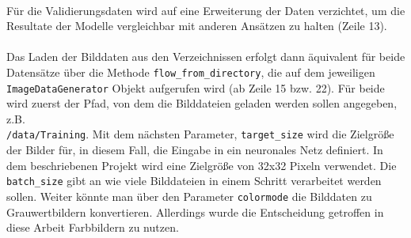 \\
Für die Validierungsdaten wird auf eine Erweiterung der Daten verzichtet, um die Resultate der Modelle vergleichbar mit anderen Ansätzen zu halten (Zeile 13).\\
\\
Das Laden der Bilddaten aus den Verzeichnissen erfolgt dann äquivalent für beide Datensätze über die Methode \texttt{flow\_from\_directory}, die auf dem jeweiligen\\
\texttt{ImageDataGenerator} Objekt aufgerufen wird (ab Zeile 15 bzw. 22). Für beide wird zuerst der Pfad, von dem die Bilddateien geladen werden sollen angegeben, z.B. \\
\texttt{/data/Training}. Mit dem nächsten Parameter, \texttt{target\_size} wird die Zielgröße der Bilder für, in diesem Fall, die Eingabe in ein neuronales Netz definiert. In dem beschriebenen Projekt wird eine Zielgröße von 32x32 Pixeln verwendet. Die \texttt{batch\_size} gibt an wie viele Bilddateien in einem Schritt verarbeitet werden sollen. Weiter könnte man über den Parameter \texttt{colormode} die Bilddaten zu Grauwertbildern konvertieren. Allerdings wurde die Entscheidung getroffen in diese Arbeit Farbbildern zu nutzen.

